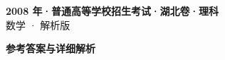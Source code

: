 \documentclass[zihao=-4, a4paper]{ctexart}
\begin{document}
\begin{center}
  {\Large\bfseries 2008 年·普通高等学校招生考试·湖北卷·理科}\\[4pt]
  {\large 数学 · 解析版}
\end{center}
\medskip
{}

\clearpage
{}
\begin{center}{\Large\bfseries 参考答案与详细解析}\end{center}
\medskip

\end{document}

